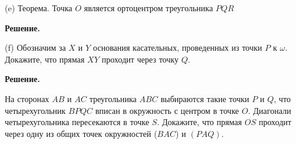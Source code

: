 (e) Теорема. Точка $O$ является ортоцентром треугольника $P Q R$

\textbf{Решение.}


(f) Обозначим за $X$ и $Y$ основания касательных, проведенных из точки $P$ к $\omega$. Докажите, что прямая $X Y$ проходит через точку $Q$.

\textbf{Решение.}

На сторонах $A B$ и $A C$ треугольника $A B C$ выбираются такие точки $P$ и $Q$, что четырехугольник $B P Q C$ вписан в окружность с центром в точке $O$. Диагонали четырехугольника пересекаются в точке $S$. Докажите, что прямая $O S$ проходит через одну из общих точек окружностей ($B A C$) и $(P A Q)$.